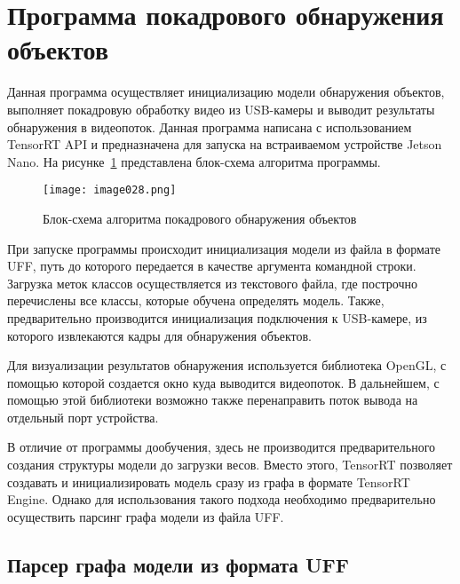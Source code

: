 \section{Программа покадрового обнаружения объектов}

Данная программа осуществляет инициализацию модели обнаружения объектов, выполняет покадровую обработку видео из USB-камеры и выводит результаты обнаружения в видеопоток. Данная программа написана с использованием TensorRT API и предназначена для запуска на встраиваемом устройстве Jetson Nano. На рисунке~\ref{fig:image028} представлена блок-схема алгоритма программы.

\begin{figure}[htbp]
\centering
\texttt{[image: image028.png]}
\caption{Блок-схема алгоритма покадрового обнаружения объектов}%
\label{fig:image028}
\end{figure}

При запуске программы происходит инициализация модели из файла в формате UFF, путь до которого передается в качестве аргумента командной строки. Загрузка меток классов осуществляется из текстового файла, где построчно перечислены все классы, которые обучена определять модель. Также, предварительно производится инициализация подключения к USB-камере, из которого извлекаются кадры для обнаружения объектов.

Для визуализации результатов обнаружения используется библиотека OpenGL, с помощью которой создается окно куда выводится видеопоток. В дальнейшем, с помощью этой библиотеки возможно также перенаправить поток вывода на отдельный порт устройства.

В отличие от программы дообучения, здесь не производится предварительного создания структуры модели до загрузки весов. Вместо этого, TensorRT позволяет создавать и инициализировать модель сразу из графа в формате TensorRT Engine. Однако для использования такого подхода необходимо предварительно осуществить парсинг графа модели из файла UFF.

\subsection{Парсер графа модели из формата UFF}

